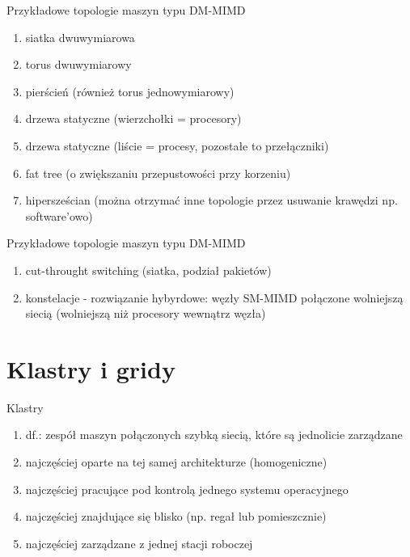 \documentclass{beamer}
\begin{document}
\begin{frame}{Przykładowe topologie maszyn typu DM-MIMD}
  \begin{enumerate}
  \item siatka dwuwymiarowa
  \item torus dwuwymiarowy
  \item pierścień (również torus jednowymiarowy)
  \item drzewa statyczne (wierzchołki = procesory)
  \item drzewa statyczne (liście = procesy, pozostałe to przełączniki)
  \item fat tree (o zwiększaniu przepustowości przy korzeniu)
  \item hipersześcian (można otrzymać inne topologie przez usuwanie krawędzi np. software'owo)
  \end{enumerate}
\end{frame}

\begin{frame}{Przykładowe topologie maszyn typu DM-MIMD}
  \begin{enumerate}
  \item cut-throught switching (siatka, podział pakietów)
  \item konstelacje - rozwiązanie hybyrdowe: węzły SM-MIMD połączone wolniejszą siecią (wolniejszą niż procesory wewnątrz węzła)
  \end{enumerate}
\end{frame}

\section{Klastry i gridy}

\begin{frame}{Klastry}
  \begin{enumerate}
  \item df.: zespół maszyn połączonych szybką siecią, które są jednolicie zarządzane
  \item najczęściej oparte na tej samej architekturze (homogeniczne)
  \item najczęściej pracujące pod kontrolą jednego systemu operacyjnego
  \item najczęściej znajdujące się blisko (np. regał lub pomieszcznie)
  \item najczęściej zarządzane z jednej stacji roboczej
  \end{enumerate}
\end{frame}
\end{document}
